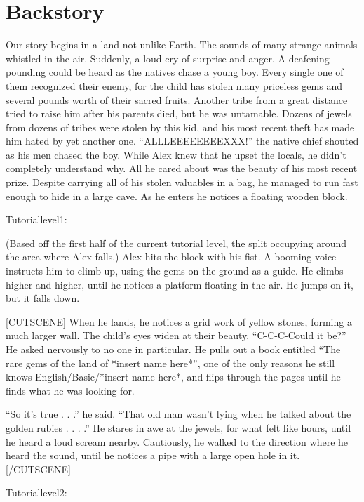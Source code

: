\documentclass{gd-document}
\begin{document}
\section{Backstory}

Our story begins in a land not unlike Earth. The sounds of many
strange animals whistled in the air. Suddenly, a loud cry of surprise
and anger. A deafening pounding could be heard as the natives chase a
young boy. Every single one of them recognized their enemy, for the
child has stolen many priceless gems and several pounds worth of their
sacred fruits. Another tribe from a great distance tried to raise him
after his parents died, but he was untamable. Dozens of jewels from
dozens of tribes were stolen by this kid, and his most recent theft
has made him hated by yet another one. “ALLLEEEEEEEEXXX!” the native
chief shouted as his men chased the boy. While Alex knew that he upset
the locals, he didn't completely understand why. All he cared about
was the beauty of his most recent prize. Despite carrying all of his
stolen valuables in a bag, he managed to run fast enough to hide in a
large cave. As he enters he notices a floating wooden block.

Tutorial\textunderscore{}level\textunderscore{}1:

(Based off the first half of the current tutorial level, the split
occupying around the area where Alex falls.) Alex hits the block with
his fist. A booming voice instructs him to climb up, using the gems on
the ground as a guide. He climbs higher and higher, until he notices a
platform floating in the air. He jumps on it, but it falls down. 

[CUTSCENE] When he lands, he notices a grid work of yellow stones,
forming a much larger wall. The child's eyes widen at their
beauty. “C-C-C-Could it be?” He asked nervously to no one in
particular. He pulls out a book entitled “The rare gems of the land of
*insert name here*”, one of the only reasons he still knows
English/Basic/*insert name here*, and flips through the pages until he
finds what he was looking for.

“So it's true . . .” he said. “That old man wasn't lying when he
talked about the golden rubies . . . .” He stares in awe at the
jewels, for what felt like hours, until he heard a loud scream
nearby. Cautiously, he walked to the direction where he heard the
sound, until he notices a pipe with a large open hole in
it. [/CUTSCENE]

Tutorial\textunderscore{}level\textunderscore{}2:
\end{document}

